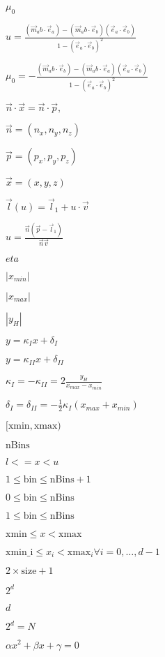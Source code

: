 \documentclass{article}
\begin{document}
$ \mu_0 $
\pagebreak

$ u = \frac{(\vec m_ab \cdot \vec e_a)-(\vec m_ab \cdot \vec e_b)(\vec e_a \cdot \vec e_b)}{1-(\vec e_a \cdot \vec e_b)^2} $
\pagebreak

$ \mu_0 = - \frac{(\vec m_ab \cdot \vec e_b)-(\vec m_ab \cdot \vec e_a)(\vec e_a \cdot \vec e_b)}{1-(\vec e_a \cdot \vec e_b)^2} $
\pagebreak

$ \vec n \cdot \vec x = \vec n \cdot \vec p,$
\pagebreak

$ \vec n = (n_{x}, n_{y}, n_{z})$
\pagebreak

$ \vec p = (p_{x}, p_{y}, p_{z})$
\pagebreak

$ \vec x = (x,y,z) $
\pagebreak

$ \vec l(u) = \vec l_{1} + u \cdot \vec v $
\pagebreak

$ u = \frac{\vec n (\vec p - \vec l_{1})}{\vec n \vec v}$
\pagebreak

$ eta $
\pagebreak

$ |x_{min}| $
\pagebreak

$ | x_{max} | $
\pagebreak

$ | y_{H} | $
\pagebreak

$ y = \kappa_{I} x + \delta_{I} $
\pagebreak

$ y = \kappa_{II} x + \delta_{II} $
\pagebreak

$ \kappa_{I} = - \kappa_{II} = 2 \frac{y_{H}}{x_{max} - x_{min}} $
\pagebreak

$ \delta_{I} = \delta_{II} = - \frac{1}{2}\kappa_{I}(x_{max} + x_{min}) $
\pagebreak

$[\text{xmin},\text{xmax})$
\pagebreak

$\text{nBins}$
\pagebreak

$l <= x < u$
\pagebreak

$1 \le \text{bin} \le \text{nBins} + 1$
\pagebreak

$0 \le \text{bin} \le \text{nBins}$
\pagebreak

$1 \le \text{bin} \le \text{nBins}$
\pagebreak

$\text{xmin} \le x < \text{xmax}$
\pagebreak

$\text{xmin_i} \le x_i < \text{xmax}_i \forall i=0, \dots, d-1$
\pagebreak

$2 \times \text{size}+1$
\pagebreak

$2^d$
\pagebreak

$d$
\pagebreak

$2^d = N $
\pagebreak

$ \alpha x^{2} + \beta x + \gamma = 0 $
\pagebreak
\end{document}
